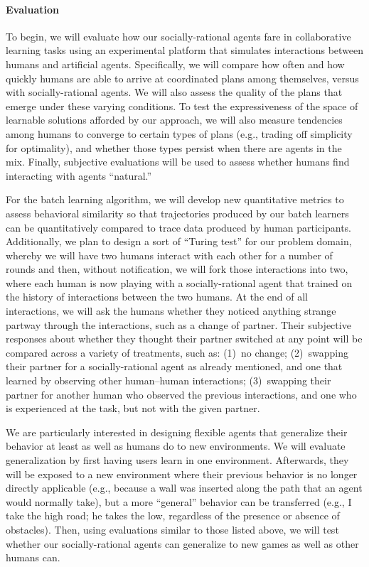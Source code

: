 
\vspace{\up}
\paragraph{Evaluation}

To begin, we will evaluate how our socially-rational agents fare in
collaborative learning tasks using an experimental platform that
simulates interactions between humans and artificial agents.
Specifically, we will compare how often and how quickly humans are
able to arrive at coordinated plans among themselves, versus with
socially-rational agents.  We will also assess the quality of the
plans that emerge under these varying conditions.  To test the
expressiveness of the space of learnable solutions afforded by our
approach, we will also measure tendencies among humans to converge to
certain types of plans (e.g., trading off simplicity for optimality),
and whether those types persist when there are agents in the mix.
Finally, subjective evaluations will be used to assess whether humans
find interacting with agents ``natural.''

For the batch learning algorithm, we will develop new quantitative
metrics to assess behavioral similarity so that trajectories produced
by our batch learners can be quantitatively compared to trace data
produced by human participants.  Additionally, we plan to design a
sort of ``Turing test'' for our problem domain, whereby we will have
two humans interact with each other for a number of rounds and then,
without notification, we will fork those interactions into two, where
each human is now playing with a socially-rational agent that trained
on the history of interactions between the two humans.  At the end of
all interactions, we will ask the humans whether they noticed anything
strange partway through the interactions, such as a change of partner.
Their subjective responses about whether they thought their partner
switched at any point will be compared across a variety of treatments,
such as: (1)~no change; (2)~swapping their partner for a
socially-rational agent as already mentioned, and one that learned by
observing other human--human interactions; (3)~swapping their partner
for another human who observed the previous interactions, and one who
is experienced at the task, but not with the given partner.

We are particularly interested in designing flexible agents that
generalize their behavior at least as well as humans do to new
environments.  We will evaluate generalization by first having users
learn in one environment.  Afterwards, they will be exposed to a new
environment where their previous behavior is no longer directly
applicable (e.g., because a wall was inserted along the path that an
agent would normally take), but a more ``general'' behavior can be
transferred (e.g., I take the high road; he takes the low, regardless
of the presence or absence of obstacles).  Then, using evaluations
similar to those listed above, we will test whether our
socially-rational agents can generalize to new games as well as other
humans can.

